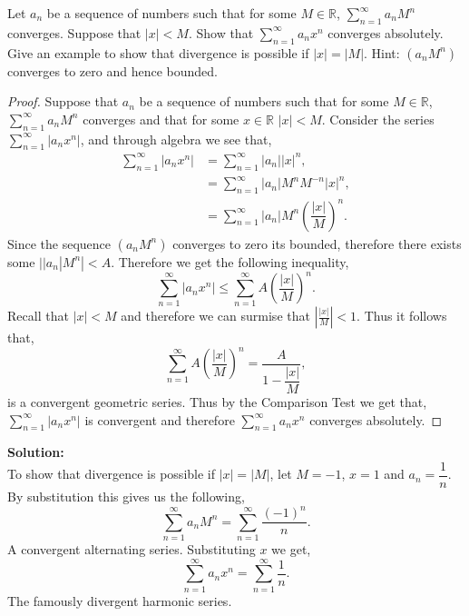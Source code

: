 \documentclass[12pt]{article}
\makeatletter
\theoremstyle{homework}
\newenvironment{exercise}[1]
{\def\@currentlabel{#1}\exercisecore}
{\endexercisecore}
\newcommand{\localhead}[1]{\par\smallskip\noindent\textbf{#1}\nobreak\\}%
\newcommand\solution{\localhead{Solution:}}
\newcommand{\Reals}{\ensuremath{\mathbb R}}
\makeatother
\begin{document}
\begin{exercise}{2} Let $a_n$ be a sequence of numbers such that for some $M \in \Reals$, $\sum_{n = 1}^{\infty}a_nM^n$ converges. Suppose
  that $|x| < M$. Show that $\sum_{n = 1}^{\infty}a_nx^n$ converges absolutely. Give an example to show that divergence is possible if $|x| = |M|$.
  Hint: $(a_nM^n)$ converges to zero and hence bounded. \\
  \begin{proof}
    Suppose that $a_n$ be a sequence of numbers such that for some $M \in \Reals$, $\sum_{n = 1}^{\infty}a_nM^n$ converges and that for some $x \in \Reals$
    $|x|<M$. Consider the series $\sum_{n = 1}^{\infty}|a_nx^n|$, and through algebra we see that,
    \begin{align*}
      \sum_{n = 1}^{\infty}|a_nx^n| &= \sum_{n = 1}^{\infty}|a_n||x|^n,\\
       &= \sum_{n = 1}^{\infty}|a_n|M^{n}M^{-n}|x|^n,\\
       &= \sum_{n = 1}^{\infty}|a_n|M^{n} \left(\dfrac{|x|}{M}\right)^n.
    \end{align*}
   Since the sequence $(a_nM^n)$ converges to zero its bounded, therefore there exists some $||a_n|M^{n}|<A$. Therefore we get the following inequality,
   \begin{equation*}
    \sum_{n = 1}^{\infty}|a_nx^n| \le \sum_{n = 1}^{\infty} A \left(\dfrac{|x|}{M}\right)^n.
   \end{equation*}
   Recall that $|x|<M$ and therefore we can surmise that $|\frac{|x|}{M}|<1$. Thus it follows that,
   \begin{equation*}
    \sum_{n = 1}^{\infty} A \left(\dfrac{|x|}{M}\right)^n = \dfrac{A}{1 - \dfrac{|x|}{M}},
   \end{equation*}
   is a convergent geometric series. Thus by the Comparison Test we get that, $\sum_{n = 1}^{\infty}|a_nx^n|$ is convergent and therefore $\sum_{n = 1}^{\infty}a_nx^n$ converges absolutely.
  \end{proof}
\vspace{.25in}

\solution  To show that divergence is possible if $|x| = |M|$, let $M = -1$, $x = 1$ and $a_n = \dfrac{1}{n}$. By substitution this gives us the following,
\begin{equation*}
  \sum_{n = 1}^{\infty}a_nM^n = \sum_{n = 1}^{\infty}\dfrac{(-1)^n}{n}.
\end{equation*}
A convergent alternating series. Substituting $x$ we get,
\begin{equation*}
  \sum_{n = 1}^{\infty}a_nx^n = \sum_{n = 1}^{\infty}\dfrac{1}{n}.
\end{equation*}
The famously divergent harmonic series. 
\end{exercise}
\vspace{.5in}
\end{document}
